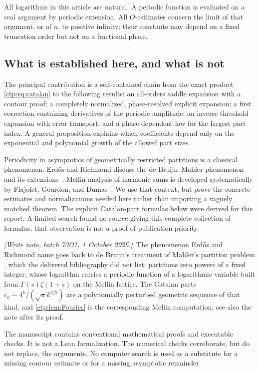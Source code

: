 \documentclass[11pt,a4paper]{article}
\numberwithin{equation}{section}
\theoremstyle{definition}
\theoremstyle{remark}
\newcommand{\writenote}[1]{\par\smallskip\noindent
 \textit{[Write note, batch 73O1, 1 October 2026.]}\ #1\par\smallskip}
\begin{document}
All logarithms in this article are natural. A periodic function is evaluated
on a real argument by periodic extension. All $O$-estimates concern the limit
of that argument, or of $n$, to positive infinity; their constants may depend
on a fixed truncation order but not on a fractional phase.

\subsection{What is established here, and what is not}
The principal contribution is a self-contained chain from the exact product
\eqref{ctp:eq:catalan} to the following results: an all-orders saddle expansion
with a contour proof; a completely normalized, phase-resolved explicit
expansion; a first correction containing derivatives of the periodic
amplitude; an inverse threshold expansion with error transport; and a
phase-dependent law for the largest part index. A general proposition
explains which coefficients depend only on the exponential and polynomial
growth of the allowed part sizes.

Periodicity in asymptotics of geometrically restricted partitions is a
classical phenomenon. Erd\H{o}s and Richmond discuss the de Bruijn--Mahler
phenomenon and its extensions~\cite{erdosrichmond}. Mellin analysis of
harmonic sums is developed systematically by Flajolet, Gourdon, and
Dumas~\cite{fgd}. We use that context, but prove the concrete estimates and
normalizations needed here rather than importing a vaguely matched theorem.
The explicit Catalan-part formulas below were derived for this report. A
limited search found no source giving this complete collection of formulas;
that observation is not a proof of publication priority.

\writenote{The phenomenon Erd\H{o}s and Richmond name goes back to de
Bruijn's treatment of Mahler's partition problem \cite{debruijn}, which
the delivered bibliography did not list: partitions into powers of a
fixed integer, whose logarithm carries a periodic function of a
logarithmic variable built from $\Gamma(s)\zeta(1+s)$ on the Mellin
lattice. The Catalan parts $c_k\sim4^k/(\sqrt\pi k^{3/2})$ are a
polynomially perturbed geometric sequence of that kind, and
\cref{ctp:lem:Fourier} is the corresponding Mellin computation; see also
the note after its proof.}

The manuscript contains conventional mathematical proofs and executable
checks. It is not a Lean formalization. The numerical checks corroborate,
but do not replace, the arguments. No computer search is used as a substitute
for a missing contour estimate or for a missing asymptotic remainder.
\end{document}
